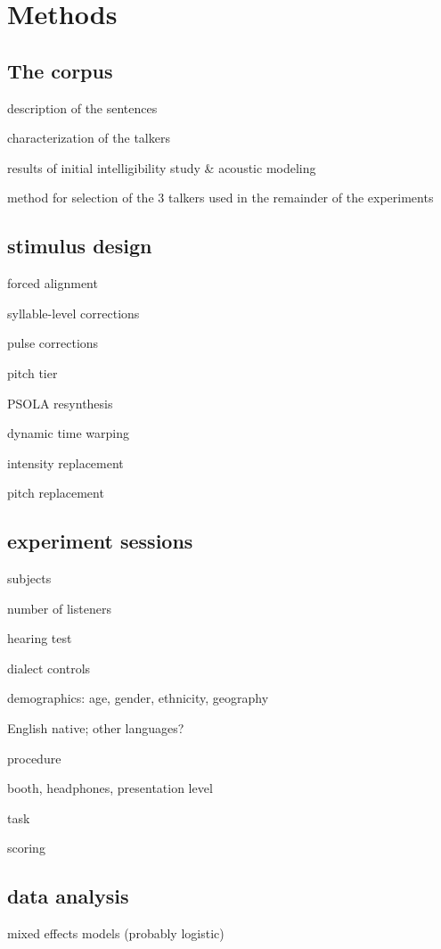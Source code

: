 \chapter{Methods}
\section{The corpus}
\begin{itm}
	\item{description of the sentences}
	\item{characterization of the talkers}
	\item{results of initial intelligibility study \& acoustic modeling}
	\item{method for selection of the 3 talkers used in the remainder of the experiments}
\end{itm}


\section{stimulus design}
\begin{itm}
	\item{forced alignment}
	\item{syllable-level corrections}
	\item{pulse corrections}
	\item{pitch tier}
	\item{PSOLA resynthesis}
	\begin{itm}
		\item{dynamic time warping}
		\item{intensity replacement}
		\item{pitch replacement}
	\end{itm}	
\end{itm}


\section{experiment sessions}
\begin{itm}
	\item{subjects}
	\begin{itm}
		\item{number of listeners}
		\item{hearing test}
		\item{dialect controls}
		\item{demographics: age, gender, ethnicity, geography}
		\item{English native; other languages?}
	\end{itm}
	\item{procedure}
	\begin{itm}
		\item{booth, headphones, presentation level}
		\item{task}
		\item{scoring}
	\end{itm}
\end{itm}

\section{data analysis}
\begin{itm}
	\item{mixed effects models (probably logistic)}
\end{itm}
